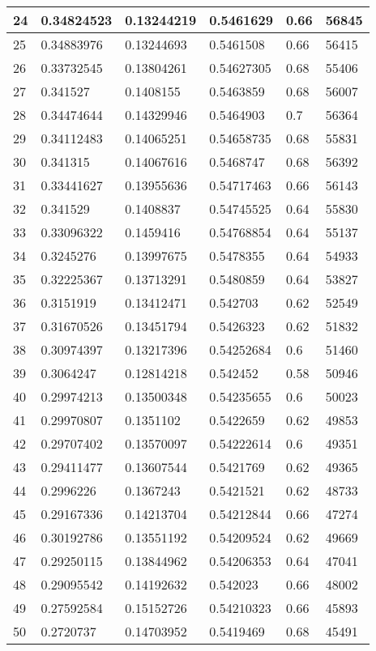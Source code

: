 \begin{longtable}{|l|l|l|l|l|l|}
24 & 0.34824523 & 0.13244219 & 0.5461629 & 0.66 & 56845 \\ \hline 
25 & 0.34883976 & 0.13244693 & 0.5461508 & 0.66 & 56415 \\ \hline 
26 & 0.33732545 & 0.13804261 & 0.54627305 & 0.68 & 55406 \\ \hline 
27 & 0.341527 & 0.1408155 & 0.5463859 & 0.68 & 56007 \\ \hline 
28 & 0.34474644 & 0.14329946 & 0.5464903 & 0.7 & 56364 \\ \hline 
29 & 0.34112483 & 0.14065251 & 0.54658735 & 0.68 & 55831 \\ \hline 
30 & 0.341315 & 0.14067616 & 0.5468747 & 0.68 & 56392 \\ \hline 
31 & 0.33441627 & 0.13955636 & 0.54717463 & 0.66 & 56143 \\ \hline 
32 & 0.341529 & 0.1408837 & 0.54745525 & 0.64 & 55830 \\ \hline 
33 & 0.33096322 & 0.1459416 & 0.54768854 & 0.64 & 55137 \\ \hline 
34 & 0.3245276 & 0.13997675 & 0.5478355 & 0.64 & 54933 \\ \hline 
35 & 0.32225367 & 0.13713291 & 0.5480859 & 0.64 & 53827 \\ \hline 
36 & 0.3151919 & 0.13412471 & 0.542703 & 0.62 & 52549 \\ \hline 
37 & 0.31670526 & 0.13451794 & 0.5426323 & 0.62 & 51832 \\ \hline 
38 & 0.30974397 & 0.13217396 & 0.54252684 & 0.6 & 51460 \\ \hline 
39 & 0.3064247 & 0.12814218 & 0.542452 & 0.58 & 50946 \\ \hline 
40 & 0.29974213 & 0.13500348 & 0.54235655 & 0.6 & 50023 \\ \hline 
41 & 0.29970807 & 0.1351102 & 0.5422659 & 0.62 & 49853 \\ \hline 
42 & 0.29707402 & 0.13570097 & 0.54222614 & 0.6 & 49351 \\ \hline 
43 & 0.29411477 & 0.13607544 & 0.5421769 & 0.62 & 49365 \\ \hline 
44 & 0.2996226 & 0.1367243 & 0.5421521 & 0.62 & 48733 \\ \hline 
45 & 0.29167336 & 0.14213704 & 0.54212844 & 0.66 & 47274 \\ \hline 
46 & 0.30192786 & 0.13551192 & 0.54209524 & 0.62 & 49669 \\ \hline 
47 & 0.29250115 & 0.13844962 & 0.54206353 & 0.64 & 47041 \\ \hline 
48 & 0.29095542 & 0.14192632 & 0.542023 & 0.66 & 48002 \\ \hline 
49 & 0.27592584 & 0.15152726 & 0.54210323 & 0.66 & 45893 \\ \hline 
50 & 0.2720737 & 0.14703952 & 0.5419469 & 0.68 & 45491 \\ \hline 
\end{longtable}